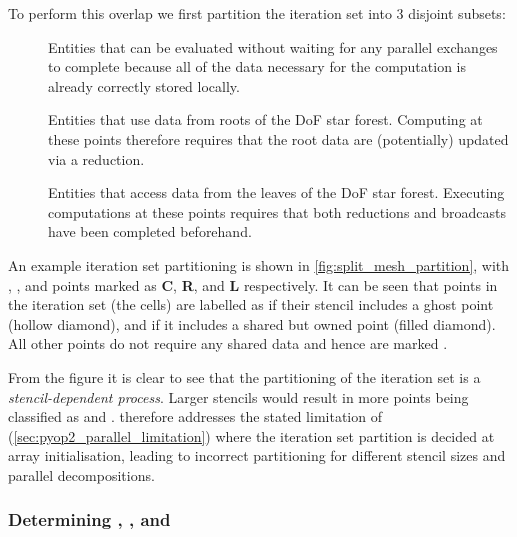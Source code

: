\documentclass[thesis]{subfiles}
\begin{document}
To perform this overlap we first partition the iteration set into 3 disjoint subsets:
\begin{description}
  \item[\coreiter{}]
    Entities that can be evaluated without waiting for any parallel exchanges to complete because all of the data necessary for the computation is already correctly stored locally.

  \item[\rootiter{}]
    Entities that use data from roots of the DoF star forest.
    Computing at these points therefore requires that the root data are (potentially) updated via a reduction.

  \item[\leafiter{}]
    Entities that access data from the leaves of the DoF star forest.
    Executing computations at these points requires that both reductions and broadcasts have been completed beforehand.
\end{description}

An example iteration set partitioning is shown in \cref{fig:split_mesh_partition}, with \coreiter{}, \rootiter{}, and \leafiter{} points marked as \textbf{C}, \textbf{R}, and \textbf{L} respectively.
It can be seen that points in the iteration set (the cells) are labelled as \leafiter{} if their stencil includes a ghost point (hollow diamond), and \rootiter{} if it includes a shared but owned point (filled diamond).
All other points do not require any shared data and hence are marked \coreiter{}.

From the figure it is clear to see that the partitioning of the iteration set is a \emph{stencil-dependent process}.
Larger stencils would result in more points being classified as \rootiter{} and \leafiter{}.
 therefore addresses the stated limitation of  (\cref{sec:pyop2_parallel_limitation}) where the iteration set partition is decided at array initialisation, leading to incorrect partitioning for different stencil sizes and parallel decompositions.

\subsubsection{Determining \coreiter{}, \rootiter{}, and \leafiter{}}
\end{document}
